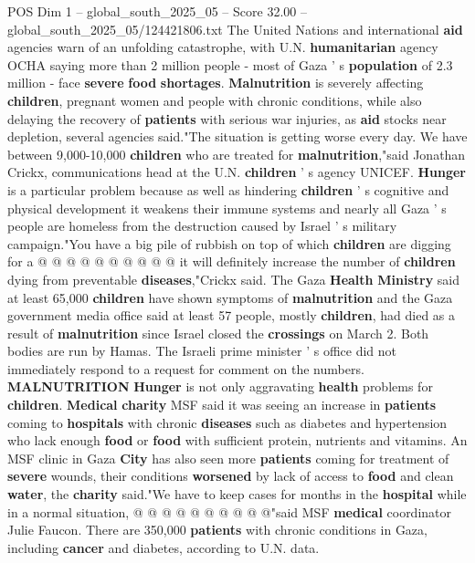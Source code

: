 \begin{textsample}{POS Dim 1 – global\_south\_2025\_05 – Score 32.00 – global\_south\_2025\_05/124421806.txt}
The United Nations and international \textbf{aid} agencies warn of an unfolding catastrophe, with U.N. \textbf{humanitarian} agency OCHA saying more than 2 million people - most of Gaza ' s \textbf{population} of 2.3 million - face \textbf{severe} \textbf{food} \textbf{shortages}. \textbf{Malnutrition} is severely affecting \textbf{children}, pregnant women and people with chronic conditions, while also delaying the recovery of \textbf{patients} with serious war injuries, as \textbf{aid} stocks near depletion, several agencies said."The situation is getting worse every day.
We have between 9,000-10,000 \textbf{children} who are treated for \textbf{malnutrition},"said Jonathan Crickx, communications head at the U.N. \textbf{children} ' s agency UNICEF. \textbf{Hunger} is a particular problem because as well as hindering \textbf{children} ' s cognitive and physical development it weakens their immune systems and nearly all Gaza ' s people are homeless from the destruction caused by Israel ' s military campaign."You have a big pile of rubbish on top of which \textbf{children} are digging for a @ @ @ @ @ @ @ @ @ @ it will definitely increase the number of \textbf{children} dying from preventable \textbf{diseases},"Crickx said.
The Gaza \textbf{Health} \textbf{Ministry} said at least 65,000 \textbf{children} have shown symptoms of \textbf{malnutrition} and the Gaza government media office said at least 57 people, mostly \textbf{children}, had died as a result of \textbf{malnutrition} since Israel closed the \textbf{crossings} on March 2.
Both bodies are run by Hamas.
The Israeli prime minister ' s office did not immediately respond to a request for comment on the numbers. \textbf{MALNUTRITION} \textbf{Hunger} is not only aggravating \textbf{health} problems for \textbf{children}. \textbf{Medical} \textbf{charity} MSF said it was seeing an increase in \textbf{patients} coming to \textbf{hospitals} with chronic \textbf{diseases} such as diabetes and hypertension who lack enough \textbf{food} or \textbf{food} with sufficient protein, nutrients and vitamins.
An MSF clinic in Gaza \textbf{City} has also seen more \textbf{patients} coming for treatment of \textbf{severe} wounds, their conditions \textbf{worsened} by lack of access to \textbf{food} and clean \textbf{water}, the \textbf{charity} said."We have to keep cases for months in the \textbf{hospital} while in a normal situation, @ @ @ @ @ @ @ @ @ @"said MSF \textbf{medical} coordinator Julie Faucon.
There are 350,000 \textbf{patients} with chronic conditions in Gaza, including \textbf{cancer} and diabetes, according to U.N. data.

\end{textsample}
